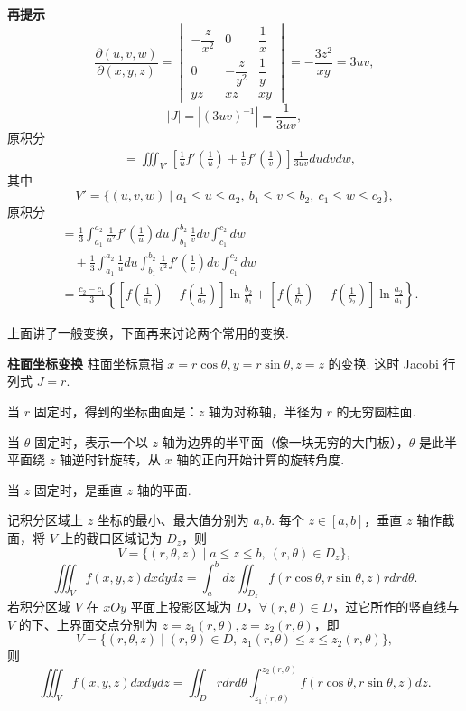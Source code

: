 \documentclass[UTF8, 12pt, fontset=fandol, oneside]{ctexart}
\begin{document}
\noindent\textbf{再提示}\quad
\[
\frac{\partial(u,v,w)}{\partial(x,y,z)}
=\begin{vmatrix}
-\dfrac z{x^2}&0&\dfrac1x\\
0&-\dfrac z{y^2}&\dfrac1y\\
yz&xz&xy
\end{vmatrix}
=-\frac{3z^2}{xy}=3uv,
\]
\[
|J|=|(3uv)^{-1}|=\frac1{3uv},
\]
原积分
\[
\begin{aligned}
&=\iiint_{V'}\left[\frac1u f'\left(\frac1u\right)+
\frac1v f'\left(\frac1v\right)\right]\frac1{3uv}dudvdw,
\end{aligned}
\]
其中
\[
V'=\{(u,v,w)\mid a_1\le u\le a_2,\ b_1\le v\le b_2,\ c_1\le w\le c_2\},
\]
原积分
\[
\begin{aligned}
&=\frac13\int_{a_1}^{a_2}\frac1{u^2}f'\left(\frac1u\right)du
\int_{b_1}^{b_2}\frac1v dv\int_{c_1}^{c_2}dw\\
&\quad+\frac13\int_{a_1}^{a_2}\frac1u du
\int_{b_1}^{b_2}\frac1{v^2}f'\left(\frac1v\right)dv\int_{c_1}^{c_2}dw\\
&=\frac{c_2-c_1}3\left\{
\left[f\left(\frac1{a_1}\right)-f\left(\frac1{a_2}\right)\right]\ln\frac{b_2}{b_1}
+\left[f\left(\frac1{b_1}\right)-f\left(\frac1{b_2}\right)\right]\ln\frac{a_2}{a_1}\right\}.
\end{aligned}
\]

上面讲了一般变换，下面再来讨论两个常用的变换.

\noindent\textbf{柱面坐标变换}\quad
柱面坐标意指 $x=r\cos\theta,y=r\sin\theta,z=z$ 的变换. 这时 Jacobi 行列式 $J=r$.

当 $r$ 固定时，得到的坐标曲面是：$z$ 轴为对称轴，半径为 $r$ 的无穷圆柱面.

当 $\theta$ 固定时，表示一个以 $z$ 轴为边界的半平面（像一块无穷的大门板），$\theta$ 是此半平面绕 $z$ 轴逆时针旋转，从 $x$ 轴的正向开始计算的旋转角度.

当 $z$ 固定时，是垂直 $z$ 轴的平面.

记积分区域上 $z$ 坐标的最小、最大值分别为 $a,b$. 每个 $z\in[a,b]$，垂直 $z$ 轴作截面，将 $V$ 上的截口区域记为 $D_z$，则
\[
V=\{(r,\theta,z)\mid a\le z\le b,\ (r,\theta)\in D_z\},
\]
\[
\iiint_Vf(x,y,z)dxdydz
=\int_a^bdz\iint_{D_z}f(r\cos\theta,r\sin\theta,z)rdrd\theta.
\]
若积分区域 $V$ 在 $xOy$ 平面上投影区域为 $D$，$\forall(r,\theta)\in D$，过它所作的竖直线与 $V$ 的下、上界面交点分别为 $z=z_1(r,\theta),z=z_2(r,\theta)$，即
\[
V=\{(r,\theta,z)\mid (r,\theta)\in D,\ z_1(r,\theta)\le z\le z_2(r,\theta)\},
\]
则
\[
\iiint_Vf(x,y,z)dxdydz
=\iint_Drdrd\theta\int_{z_1(r,\theta)}^{z_2(r,\theta)}
f(r\cos\theta,r\sin\theta,z)dz.
\]
\end{document}

